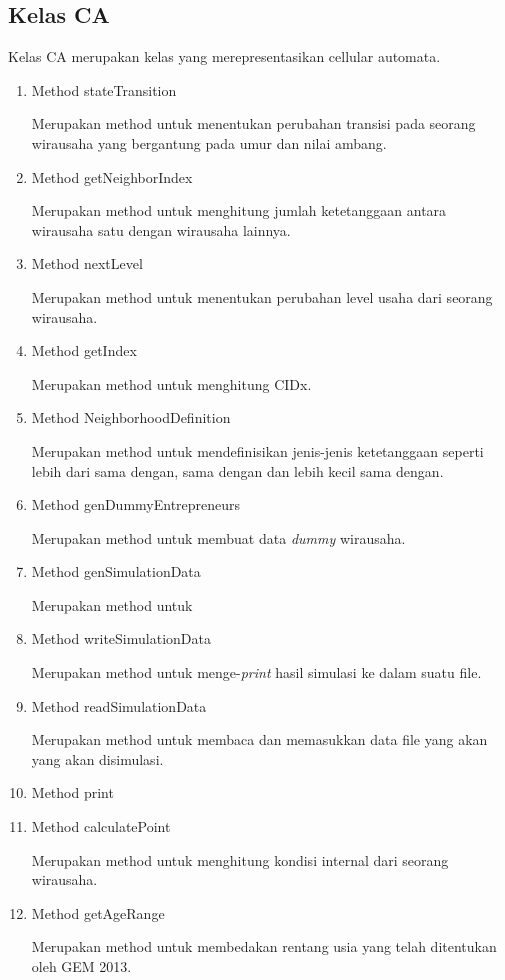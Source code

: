 \subsection{Kelas CA} 
Kelas CA merupakan kelas yang merepresentasikan cellular automata.
		\begin{enumerate}
			\item Method stateTransition
			
			Merupakan method untuk menentukan perubahan transisi pada seorang wirausaha yang bergantung pada umur dan nilai ambang.
			\item Method getNeighborIndex
			
			Merupakan method untuk menghitung jumlah ketetanggaan antara wirausaha satu dengan wirausaha lainnya.
			\item Method nextLevel
			
			Merupakan method untuk menentukan perubahan level usaha dari seorang wirausaha.
			
			\item Method getIndex
			
			Merupakan method untuk menghitung CIDx.
			
			\item Method NeighborhoodDefinition
			
			Merupakan method untuk mendefinisikan jenis-jenis ketetanggaan seperti lebih dari sama dengan, sama dengan dan lebih kecil sama dengan.
			
			\item Method genDummyEntrepreneurs
			
			Merupakan method untuk membuat data \textit{dummy} wirausaha.
			\item Method genSimulationData
			
			Merupakan method untuk 
			\item Method writeSimulationData
			
			Merupakan method untuk menge-\textit{print} hasil simulasi ke dalam suatu file.
			\item Method readSimulationData
			
			Merupakan method untuk membaca dan memasukkan data file yang akan yang akan disimulasi.
			\item Method print
			\item Method calculatePoint
			
			Merupakan method untuk menghitung kondisi internal dari seorang wirausaha.
			\item Method getAgeRange
			
			Merupakan method untuk membedakan rentang usia yang telah ditentukan oleh GEM 2013.
		\end{enumerate}
